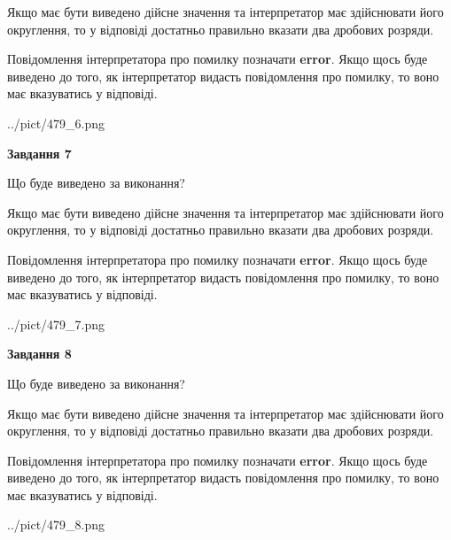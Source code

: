 \documentclass[12pt, ukrainian]{article}
\begin{document}
{\begin {Large}
Якщо має бути виведено дійсне значення та інтерпретатор має здійснювати його округлення, 
то у відповіді достатньо правильно вказати два дробових розряди.

Повідомлення інтерпретатора про помилку позначати \textbf{error}.
Якщо щось буде виведено до того, як інтерпретатор видасть повідомлення про помилку, 
то воно має вказуватись у відповіді. \par

\begin{center}
	{../pict/479_6.png}
\end{center}
\newpage

{\begin {center}\textbf{Завдання 7}\end {center}}\par
Що буде виведено за виконання? \par

Якщо має бути виведено дійсне значення та інтерпретатор має здійснювати його округлення, 
то у відповіді достатньо правильно вказати два дробових розряди.

Повідомлення інтерпретатора про помилку позначати \textbf{error}.
Якщо щось буде виведено до того, як інтерпретатор видасть повідомлення про помилку, 
то воно має вказуватись у відповіді. \par

\begin{center}
	{../pict/479_7.png}
\end{center}
\newpage

{\begin {center}\textbf{Завдання 8}\end {center}}\par
Що буде виведено за виконання? \par

Якщо має бути виведено дійсне значення та інтерпретатор має здійснювати його округлення, 
то у відповіді достатньо правильно вказати два дробових розряди.

Повідомлення інтерпретатора про помилку позначати \textbf{error}.
Якщо щось буде виведено до того, як інтерпретатор видасть повідомлення про помилку, 
то воно має вказуватись у відповіді. \par

\begin{center}
	{../pict/479_8.png}
\end{center}
\newpage


\end{Large}}
\end{document}
